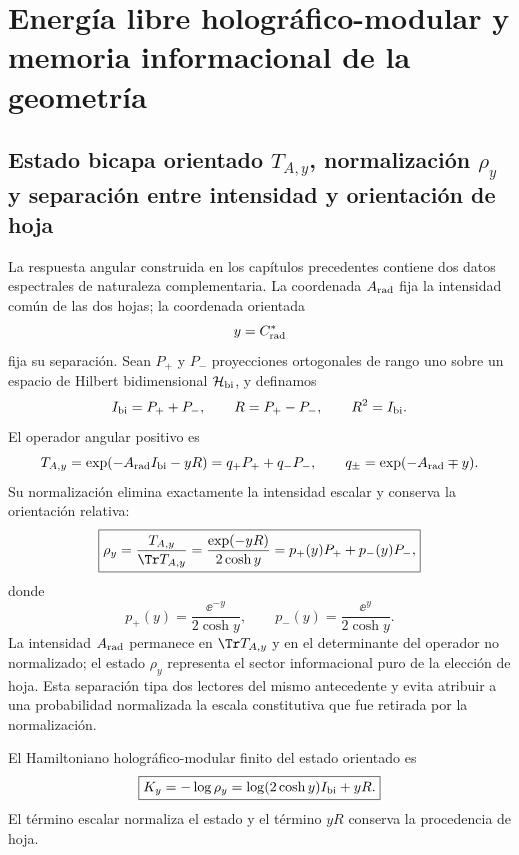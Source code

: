 \chapter{Energ\'ia libre hologr\'afico-modular y memoria informacional de la geometr\'ia}
\label{chap:energia-libre-holografica}

\section{Estado bicapa orientado \(T_{A,y}\), normalización \(\rho_y\) y separación entre intensidad y orientación de hoja}

La respuesta angular construida en los cap\'itulos precedentes contiene dos
datos espectrales de naturaleza complementaria. La coordenada
\(A_{\rm rad}\) fija la intensidad com\'un de las dos hojas; la coordenada
orientada
\[
 y=C^{*}_{\rm rad}
\]
fija su separaci\'on. Sean \(P_+\) y \(P_-\) proyecciones ortogonales de
rango uno sobre un espacio de Hilbert bidimensional \(\mathcal H_{\rm bi}\),
y definamos
\begin{equation}
 I_{\rm bi}=P_++P_-,
 \qquad
 R=P_+-P_-,
 \qquad
 R^2=I_{\rm bi}.
 \label{eq:rm-info-graduacion}
\end{equation}
El operador angular positivo es
\begin{equation}
 T_{A,y}
 =\exp(-A_{\rm rad}I_{\rm bi}-yR)
 =q_+P_++q_-P_-,
 \qquad
 q_\pm=\exp(-A_{\rm rad}\mp y).
 \label{eq:rm-info-operador-angular}
\end{equation}
Su normalizaci\'on elimina exactamente la intensidad escalar y conserva la
orientaci\'on relativa:
\begin{equation}
 \boxed{
 \rho_y
 =\frac{T_{A,y}}{\Tr T_{A,y}}
 =\frac{\exp(-yR)}{2\cosh y}
 =p_+(y)P_++p_-(y)P_- ,}
 \label{eq:rm-info-rho-y}
\end{equation}
donde
\begin{equation}
 p_+(y)=\frac{\ee^{-y}}{2\cosh y},
 \qquad
 p_-(y)=\frac{\ee^{y}}{2\cosh y}.
 \label{eq:rm-info-probabilidades-hoja}
\end{equation}
La intensidad \(A_{\rm rad}\) permanece en \(\Tr T_{A,y}\) y en el
determinante del operador no normalizado; el estado \(\rho_y\) representa el
sector informacional puro de la elecci\'on de hoja. Esta separaci\'on tipa dos
lectores del mismo antecedente y evita atribuir a una probabilidad
normalizada la escala constitutiva que fue retirada por la normalizaci\'on.

\begin{definition}
El Hamiltoniano hologr\'afico-modular finito del estado orientado es
\begin{equation}
 \boxed{
 K_y=-\log\rho_y
 =\log(2\cosh y)I_{\rm bi}+yR.}
 \label{eq:rm-info-hamiltoniano-bicapa}
\end{equation}
El t\'ermino escalar normaliza el estado y el t\'ermino \(yR\) conserva la
procedencia de hoja.
\end{definition}

